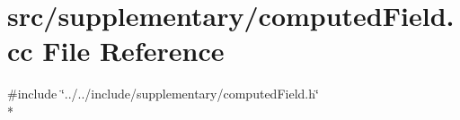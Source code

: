 \section{src/supplementary/computed\-Field.cc File Reference}
\label{computed_field_8cc}
{\ttfamily \#include \char`\"{}../../include/supplementary/computed\-Field.\-h\char`\"{}}\\*
